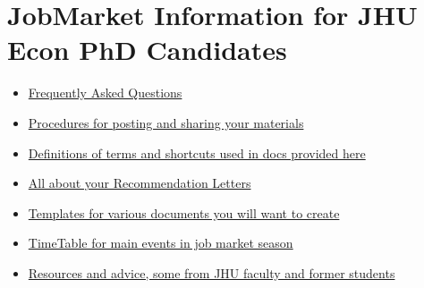 \documentclass{\classes/econtex}
\begin{document}
\medskip


\section*{JobMarket Information for JHU Econ PhD Candidates}

\begin{itemize}
  \item \href{\pageurl/FAQ}{Frequently Asked Questions}
  \item \href{\bloburl/JobMarketProceduresHelp.md}{Procedures for posting and sharing your materials}
  \item \href{\pageurl/Notation}{Definitions of terms and shortcuts used in docs provided here}
  \item \href{\pageurl/RecLetters}{All about your Recommendation Letters}
  \item \href{\bloburl/Templates}{Templates for various documents you will want to create}
  \item \href{\pageurl/TimeTable}{TimeTable for main events in job market season}
  \item \href{\pageurl/Resources}{Resources and advice, some from JHU faculty and former students}
\end{itemize}
\end{document}
